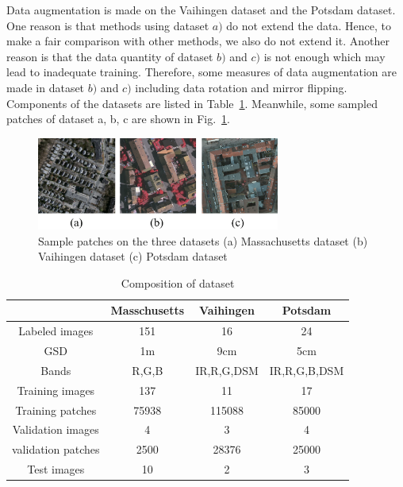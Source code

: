 Data augmentation is made on the Vaihingen dataset and the Potsdam dataset.
One reason is that methods using dataset ${a)}$ do not extend the data.
Hence, to make a fair comparison with other methods, we also do not extend it.
Another reason is that the data quantity of dataset ${b)}$ and ${c)}$ is not enough which may lead to inadequate training.
Therefore, some measures of data augmentation are made in dataset ${b)}$ and ${c)}$ including data rotation and mirror flipping.
Components of the datasets are listed in Table~\ref{table:dataset-composition}.
Meanwhile, some sampled patches of dataset a, b, c are shown in Fig.~\ref{fig:dataset_sample}.


\begin{figure}
\centering
\includegraphics[width=8cm]{Figures/datasets.eps}
\caption{Sample patches on the three datasets  (a) Massachusetts dataset (b) Vaihingen dataset (c) Potsdam dataset}
\label{fig:dataset_sample}
\end{figure}

\begin{table}
 \centering
 \caption{Composition of dataset}
 \label{table:dataset-composition}
 \begin{tabular}{c|ccc}
\hline
& Masschusetts & Vaihingen & Potsdam\\  \hline
Labeled images & 151& 16 &24\\ \hline
GSD & 1m & 9cm & 5cm\\ \hline
Bands & R,G,B & IR,R,G,DSM & IR,R,G,B,DSM\\ \hline
Training images &137 & 11 & 17\\ \hline
Training patches&75938 &115088 &85000\\ \hline
Validation images & 4 & 3 & 4\\ \hline
validation patches &2500 & 28376 &25000 \\\hline
Test images & 10 & 2 & 3\\ \hline
\end{tabular}
\end {table}



